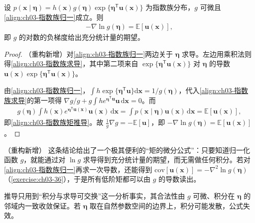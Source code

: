\documentclass[../../main.tex]{subfiles}
\begin{document}
\begin{proposition}[指数族的矩]\label{proposition:ch03-指数族矩}
设 $p(\boldsymbol{x}\mid\boldsymbol{\eta})=h(\boldsymbol{x})g(\boldsymbol{\eta})\exp\{\boldsymbol{\eta}^{\mathsf{T}}\boldsymbol{u}(\boldsymbol{x})\}$ 为指数族分布，$g$ 可微且\eqref{align:ch03-指数族归一}成立。则
\begin{align*}
-\nabla\ln g(\boldsymbol{\eta})=\mathbb{E}[\boldsymbol{u}(\boldsymbol{x})],
\end{align*}
即 $g$ 的对数的负梯度给出充分统计量的期望。
\end{proposition}
\begin{proof}
（重构新增）对\eqref{align:ch03-指数族归一}两边关于 $\boldsymbol{\eta}$ 求导。左边用乘积法则得\eqref{align:ch03-指数族求导}，其中第二项来自 $\exp\{\boldsymbol{\eta}^{\mathsf{T}}\boldsymbol{u}(\boldsymbol{x})\}$ 对 $\boldsymbol{\eta}$ 的导数 $\boldsymbol{u}(\boldsymbol{x})\exp\{\boldsymbol{\eta}^{\mathsf{T}}\boldsymbol{u}(\boldsymbol{x})\}$。

由\eqref{align:ch03-指数族归一}，$\int h\exp\{\boldsymbol{\eta}^{\mathsf{T}}\boldsymbol{u}\}\mathrm{d}\boldsymbol{x}=1/g(\boldsymbol{\eta})$，代入\eqref{align:ch03-指数族求导}的第一项得 $\nabla g/g+g\int h e^{\boldsymbol{\eta}^{\mathsf{T}}\boldsymbol{u}}\boldsymbol{u}\,\mathrm{d}\boldsymbol{x}=0$。而
\begin{align*}
g(\boldsymbol{\eta})\int h(\boldsymbol{x})e^{\boldsymbol{\eta}^{\mathsf{T}}\boldsymbol{u}(\boldsymbol{x})}\boldsymbol{u}(\boldsymbol{x})\,\mathrm{d}\boldsymbol{x}=\int p(\boldsymbol{x}\mid\boldsymbol{\eta})\boldsymbol{u}(\boldsymbol{x})\,\mathrm{d}\boldsymbol{x}=\mathbb{E}[\boldsymbol{u}(\boldsymbol{x})],
\end{align*}
即\eqref{align:ch03-指数族矩推导}。故 $\frac{1}{g}\nabla g=-\mathbb{E}[\boldsymbol{u}]$，即 $-\nabla\ln g(\boldsymbol{\eta})=\mathbb{E}[\boldsymbol{u}(\boldsymbol{x})]$。
\end{proof}

\begin{remark}（重构新增）
这条结论给出了一个极其便利的“矩的微分公式”：只要知道归一化函数 $g$，就能通过对 $\ln g$ 求导得到充分统计量的期望，而无需做任何积分。若对\eqref{align:ch03-指数族归一}再求一次导数，还能得到 $\mathrm{cov}[\boldsymbol{u}(\boldsymbol{x})]=-\nabla^{2}\ln g(\boldsymbol{\eta})$（\cref{exercise:ch03-36}），于是所有低阶矩都可以由 $g$ 的导数读出。

推导只用到“积分与求导可交换”这一分析事实，其合法性由 $g$ 可微、积分在 $\boldsymbol{\eta}$ 的邻域内一致收敛保证。若 $\boldsymbol{\eta}$ 取在自然参数空间的边界上，积分可能发散，公式失效。
\end{remark}
\end{document}
